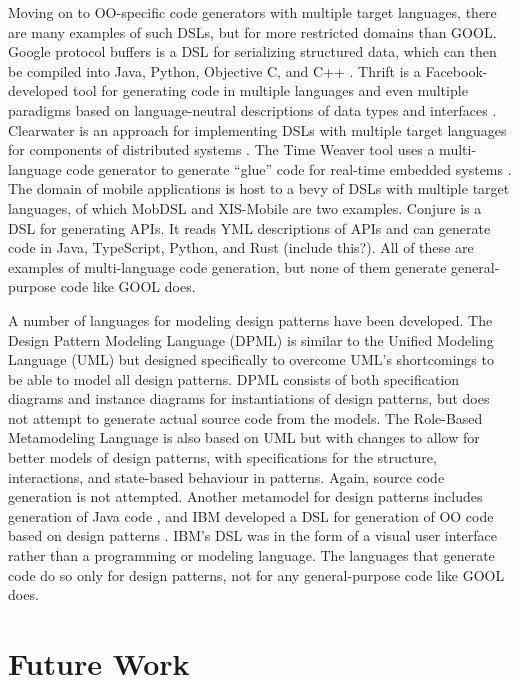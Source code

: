 \documentclass[sigplan,review,anonymous,prologue,dvipsnames]{acmart}
\begin{document}
Moving on to OO-specific code generators with multiple target languages, there 
are many examples of such DSLs, but for more restricted domains than GOOL. 
Google protocol buffers is a DSL for serializing structured data, which can 
then be compiled into Java, Python, Objective C, and C++ \cite{Protobuf}. 
Thrift is a Facebook-developed tool for generating code in multiple languages 
and even multiple paradigms based on language-neutral descriptions of data 
types and interfaces \cite{slee2007thrift}. Clearwater is an approach for 
implementing DSLs with multiple target languages for components of distributed 
systems \cite{swint2005clearwater}. The Time Weaver tool uses a multi-language 
code generator to generate ``glue'' code for real-time embedded systems 
\cite{de2004glue}. The domain of mobile applications is host to a bevy of DSLs 
with multiple target languages, of which MobDSL \cite{kramer2010mobdsl} and 
XIS-Mobile \cite{ribeiro2014xis} are two examples. Conjure is a DSL for 
generating APIs. It reads YML descriptions of APIs and can generate code in 
Java, TypeScript, Python, and Rust \cite{Conjure} (include this?). All of these 
are examples of multi-language code generation, but none of them generate 
general-purpose code like GOOL does.

A number of languages for modeling design patterns have been developed. The 
Design Pattern Modeling Language (DPML) \cite{mapelsden2002design} is similar 
to the Unified Modeling Language (UML) but designed specifically to overcome 
UML's shortcomings to be able to model all design patterns. DPML consists of 
both specification diagrams and instance diagrams for instantiations of design 
patterns, but does not attempt to generate actual source code from the models. 
The Role-Based Metamodeling Language \cite{kim2003uml} is also based on UML but 
with changes to allow for better models of design patterns, with specifications 
for the structure, interactions, and state-based behaviour in patterns. Again, 
source code generation is not attempted. Another metamodel for design patterns 
includes generation of Java code \cite{albin2001meta}, and IBM developed a DSL 
for generation of OO code based on design patterns 
\cite{budinsky1996automatic}. IBM's DSL was in the form of a visual user 
interface rather than a programming or modeling language. The languages that 
generate code do so only for design patterns, not for any general-purpose code 
like GOOL does.

\section{Future Work} \label{sec:future}
\end{document}
